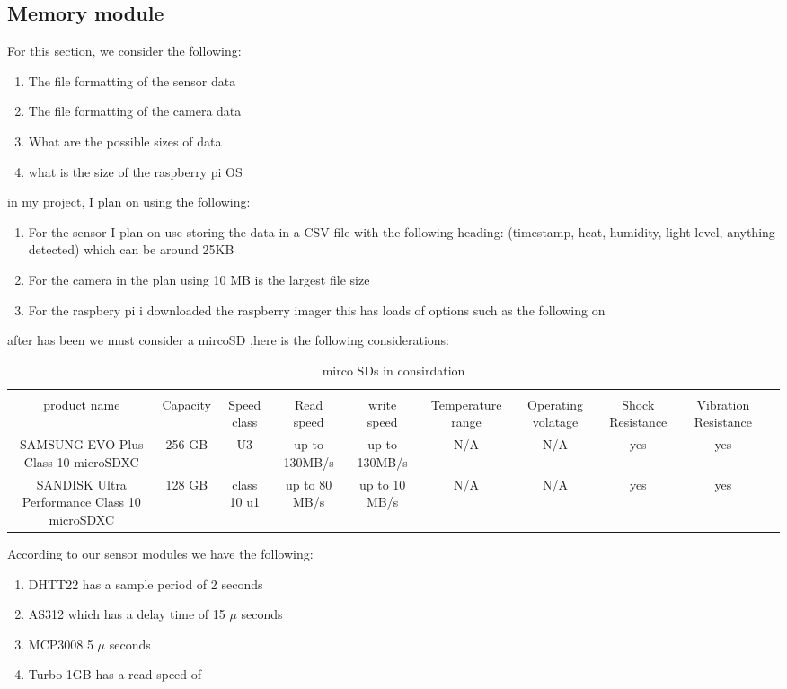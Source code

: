 \subsection{Memory module}
For this section, we consider the following:
\begin{enumerate}
	\item The file formatting of the sensor data
	\item The file formatting of  the camera data
	\item What are  the possible sizes of data
	\item what is the size of the  raspberry pi OS
\end{enumerate}
in my project, I plan on using the following:
\begin{enumerate}
	\item For the sensor I plan on use storing the data  in a  CSV file   with the following heading: (timestamp, heat, humidity, light level, anything detected) which can be around 25KB
	\item For the camera in the plan using 10 MB is the  largest file  size
	\item For the raspbery pi i downloaded  the raspberry imager  this has  loads of  options such as  the  following on \pageref{pi os}
\end{enumerate}
after has been we must consider a  mircoSD ,here is the following considerations:
\begin{table}
	\begin{tabular}{|c|c|c|c|c|c|c|c|c|c|}
		\hline \\
		product name & Capacity & Speed class & Read speed & write speed & Temperature range & Operating volatage &Shock Resistance &Vibration Resistance \\
		\hline \hline
		SAMSUNG EVO Plus Class 10 microSDXC& 256 GB &U3&up to 130MB/s&up to 130MB/s&N/A&N/A&yes&yes \\
		SANDISK Ultra Performance Class 10 microSDXC&128 GB& class 10 u1&up to 80 MB/s&up to 10 MB/s&N/A&N/A&yes&yes \\

		\hline
	\end{tabular}
	\caption{mirco SDs in consirdation}
	\label{mirco SDs in consirdation}
\end{table}
According  to our  sensor modules we have the  following:
\begin{enumerate}
	\item DHTT22 has a sample period of  2 seconds
	\item AS312 which has a  delay time of 15 $\mu$ seconds
	\item MCP3008 5 $\mu$ seconds
	\item Turbo 1GB has a  read speed of 
\end{enumerate}
